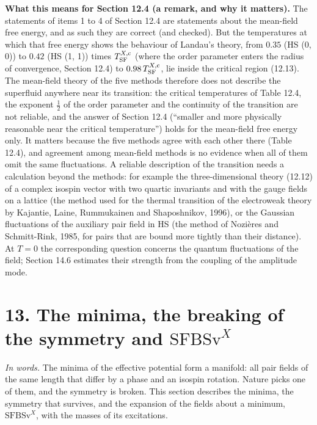 \documentclass[
  10pt,
]{article}
\begin{document}
\textbf{What this means for Section 12.4 (a remark, and why it
matters).} The statements of items 1 to 4 of Section 12.4 are statements
about the mean-field free energy, and as such they are correct (and
checked). But the temperatures at which that free energy shows the
behaviour of Landau's theory, from \(0.35\) (HS (0, 0)) to \(0.42\) (HS
(1, 1)) times \(T^{X,{\rm c}}_{\rm SF}\) (where the order parameter
enters the radius of convergence, Section 12.4) to
\(0.98\,T^{X,{\rm c}}_{\rm SF}\), lie inside the critical region
(12.13). The mean-field theory of the five methods therefore does not
describe the superfluid anywhere near its transition: the critical
temperatures of Table 12.4, the exponent \(\tfrac12\) of the order
parameter and the continuity of the transition are not reliable, and the
answer of Section 12.4 (``smaller and more physically reasonable near
the critical temperature'') holds for the mean-field free energy only.
It matters because the five methods agree with each other there (Table
12.4), and agreement among mean-field methods is no evidence when all of
them omit the same fluctuations. A reliable description of the
transition needs a calculation beyond the methods: for example the
three-dimensional theory (12.12) of a complex isospin vector with two
quartic invariants and with the gauge fields on a lattice (the method
used for the thermal transition of the electroweak theory by Kajantie,
Laine, Rummukainen and Shaposhnikov, 1996), or the Gaussian fluctuations
of the auxiliary pair field in HS (the method of Nozières and
Schmitt-Rink, 1985, for pairs that are bound more tightly than their
distance). At \(T=0\) the corresponding question concerns the quantum
fluctuations of the field; Section 14.6 estimates their strength from
the coupling of the amplitude mode.

\hypertarget{the-minima-the-breaking-of-the-symmetry-and-mathrmsfbsvx}{%
\section{\texorpdfstring{13. The minima, the breaking of the symmetry
and
\(\mathrm{SFBSv}^X\)}{13. The minima, the breaking of the symmetry and \textbackslash mathrm\{SFBSv\}\^{}X}}\label{the-minima-the-breaking-of-the-symmetry-and-mathrmsfbsvx}}

\emph{In words.} The minima of the effective potential form a manifold:
all pair fields of the same length that differ by a phase and an isospin
rotation. Nature picks one of them, and the symmetry is broken. This
section describes the minima, the symmetry that survives, and the
expansion of the fields about a minimum, \(\mathrm{SFBSv}^X\), with the
masses of its excitations.
\end{document}
